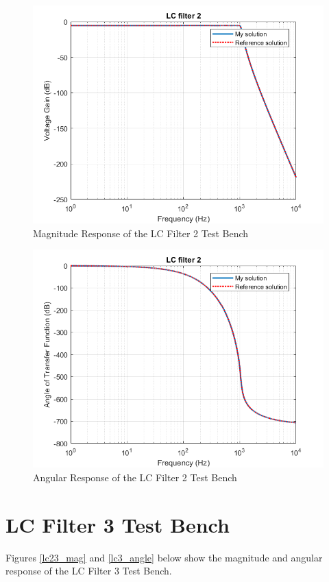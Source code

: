 \documentclass[a4paper,titlepage]{article}
\begin{document}
		\begin{figure}[H]
			\centering
			\includegraphics[width=0.7\linewidth]{../../src/a3/plots/LCFilter2_gain}
			\caption{Magnitude Response of the LC Filter 2 Test Bench}
			\label{lc2_mag}
		\end{figure}
		\begin{figure}[H]
			\centering
			\includegraphics[width=0.7\linewidth]{../../src/a3/plots/LCFilter2_angle}
			\caption{Angular Response of the LC Filter 2 Test Bench}
			\label{lc2_angle}
		\end{figure}
	
		\newpage
		\section{LC Filter 3 Test Bench}
		Figures \ref{lc23_mag} and \ref{lc3_angle} below show the magnitude and angular response of the LC Filter 3 Test Bench. 
		
\end{document}
